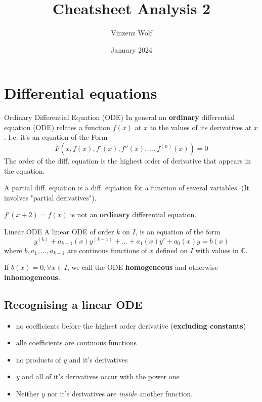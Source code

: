 \documentclass[a4paper,fontsize = 10pt]{article}
\title{Cheatsheet Analysis 2}
\author{Vinzenz Wolf}
\date{January 2024}
\def\C{\mathbb{C}}
\begin{document}
\maketitle

\setlength{\abovedisplayskip}{3pt}
\setlength{\belowdisplayskip}{3pt}
\setlength{\lineskip}{0pt}
\setlength{\parindent}{0pt}
\footnotesize

\section{Differential equations}
\begin{mainbox}{Ordinary Differential Equation (ODE)}
    In general an \textbf{ordinary} differential equation (ODE) relates a function $f(x)$ at $x$ to the values of its derivatives at $x$.
    I.e. it's an equation of the Form $$F(x, f(x), f'(x), f''(x), ..., f^{(n)}(x)) = 0$$ 
    The order of the diff. equation is the highest order of derivative that appears in the equation.

    A partial diff. equation is a diff. equation for a function of several variables. (It involves "partial derivatives").
\end{mainbox}
$f'(x+2) = f(x)$ is not an \textbf{ordinary} differential equation.

\begin{mainbox}{Linear ODE}
    A linear ODE of order $k$ on $I$, is an equation of the form $$y^{(k)} + a_{k-1}(x)y^{(k-1)}+...+a_1(x)y'+a_0(x)y = b(x)$$ 
    where $b, a_1, ..., a_{k-1}$ are continous functions of $x$ defined on $I$ with values in $\C$.

    If $b(x) = 0, \forall x \in I$, we call the ODE \textbf{homogeneous} and otherwise \textbf{inhomogeneous}. 
\end{mainbox}

\subsection*{Recognising a linear ODE}
\begin{itemize}
    \item no coefficients before the highest order derivative (\textbf{excluding constants})
    \item alle coefficients are continous functions
    \item no products of $y$ and it's derivatives
    \item $y$ and all of it's derivatives occur with the power one
    \item Neither $y$ nor it's derivatives are \textit{inside} another function.
\end{itemize}
\end{document}
